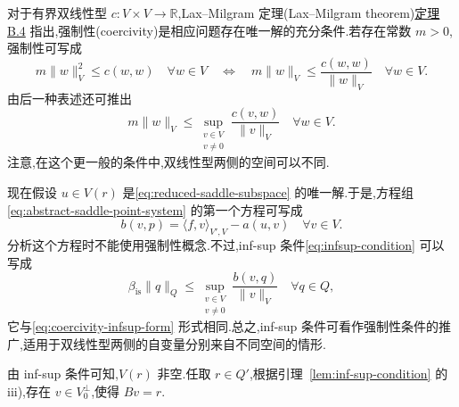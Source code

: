 \begin{note}\label{note:infsup-coercivity}
对于有界双线性型 $c:V\times V\to\mathbb{R}$,Lax--Milgram 定理(Lax--Milgram theorem)\hyperref[thm:appendix-b-4]{定理 B.4} 指出,强制性(coercivity)是相应问题存在唯一解的充分条件.若存在常数 $m>0$,强制性可写成
\[
  m\|w\|_V^2\le c(w,w)\quad\forall w\in V
  \quad\Longleftrightarrow\quad
  m\|w\|_V\le\frac{c(w,w)}{\|w\|_V}\quad\forall w\in V.
\]
由后一种表述还可推出
\begin{equation}\label{eq:coercivity-infsup-form}
  m\|w\|_V\le
  \sup_{\substack{v\in V\\v\ne0}}
    \frac{c(v,w)}{\|v\|_V}
  \quad\forall w\in V.
\end{equation}
注意,在这个更一般的条件中,双线性型两侧的空间可以不同.

现在假设 $u\in V(r)$ 是\cref{eq:reduced-saddle-subspace} 的唯一解.于是,方程组\cref{eq:abstract-saddle-point-system} 的第一个方程可写成
\[
  b(v,p)=\langle f,v\rangle_{V',V}-a(u,v)
  \quad\forall v\in V.
\]
分析这个方程时不能使用强制性概念.不过,inf-sup 条件\cref{eq:infsup-condition} 可以写成
\[
  \beta_{\mathrm{is}}\|q\|_Q\le
  \sup_{\substack{v\in V\\v\ne0}}
    \frac{b(v,q)}{\|v\|_V}
  \quad\forall q\in Q,
\]
它与\cref{eq:coercivity-infsup-form} 形式相同.总之,inf-sup 条件可看作强制性条件的推广,适用于双线性型两侧的自变量分别来自不同空间的情形.
\end{note}

\begin{note}[$V(r)$ 非空]\label{note:affine-set-nonempty}
由 inf-sup 条件可知,$V(r)$ 非空.任取 $r\in Q'$,根据引理~\ref{lem:inf-sup-condition} 的 iii),存在 $v\in V_0^{\perp}$,使得 $Bv=r$.
\end{note}

